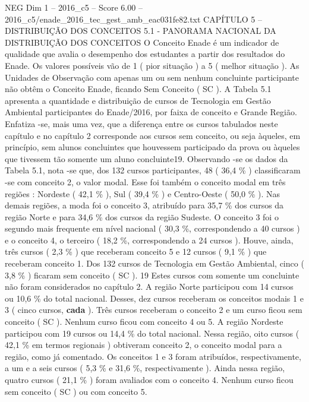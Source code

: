 \begin{textsample}{NEG Dim 1 – 2016\_c5 – Score 6.00 – 2016\_c5/enade\_2016\_tec\_gest\_amb\_eac031fe82.txt}  \label{ex:f1_neg_361}
CAPÍTULO 5 – DISTRIBUIÇÃO DOS CONCEITOS 5.1 - PANORAMA NACIONAL DA DISTRIBUIÇÃO DOS CONCEITOS O Conceito Enade é um indicador de qualidade que avalia o desempenho dos estudantes a partir dos resultados do Enade.
Os valores possíveis vão de 1 ( pior situação ) a 5 ( melhor situação ).
As Unidades de Observação com apenas um ou sem nenhum concluinte participante não obtêm o Conceito Enade, ficando Sem Conceito ( SC ).
A Tabela 5.1 apresenta a quantidade e distribuição de cursos de Tecnologia em Gestão Ambiental participantes do Enade/2016, por faixa de conceito e Grande Região.
Enfatiza -se, mais uma vez, que a diferença entre os cursos tabulados neste capítulo e no capítulo 2 corresponde aos cursos sem conceito, ou seja àqueles, em princípio, sem alunos concluintes que houvessem participado da prova ou àqueles que tivessem tão somente um aluno concluinte19.
Observando -se os dados da Tabela 5.1, nota -se que, dos 132 cursos participantes, 48 ( 36,4 \% ) classificaram -se com conceito 2, o valor modal.
Esse foi também o conceito modal em três regiões : Nordeste ( 42,1 \% ), Sul ( 39,4 \% ) e Centro-Oeste ( 50,0 \% ).
Nas demais regiões, a moda foi o conceito 3, atribuído para 35,7 \% dos cursos da região Norte e para 34,6 \% dos cursos da região Sudeste.
O conceito 3 foi o segundo mais frequente em nível nacional ( 30,3 \%, correspondendo a 40 cursos ) e o conceito 4, o terceiro ( 18,2 \%, correspondendo a 24 cursos ).
Houve, ainda, três cursos ( 2,3 \% ) que receberam conceito 5 e 12 cursos ( 9,1 \% ) que receberam conceito 1.
Dos 132 cursos de Tecnologia em Gestão Ambiental, cinco ( 3,8 \% ) ficaram sem conceito ( SC ). 19 Estes cursos com somente um concluinte não foram considerados no capítulo 2.
A região Norte participou com 14 cursos ou 10,6 \% do total nacional.
Desses, dez cursos receberam os conceitos modais 1 e 3 ( cinco cursos, \textbf{cada} ).
Três cursos receberam o conceito 2 e um curso ficou sem conceito ( SC ).
Nenhum curso ficou com conceito 4 ou 5.
A região Nordeste participou com 19 cursos ou 14,4 \% do total nacional.
Nessa região, oito cursos ( 42,1 \% em termos regionais ) obtiveram conceito 2, o conceito modal para a região, como já comentado.
Os conceitos 1 e 3 foram atribuídos, respectivamente, a um e a seis cursos ( 5,3 \% e 31,6 \%, respectivamente ).
Ainda nessa região, quatro cursos ( 21,1 \% ) foram avaliados com o conceito 4.
Nenhum curso ficou sem conceito ( SC ) ou com conceito 5.

\end{textsample}
